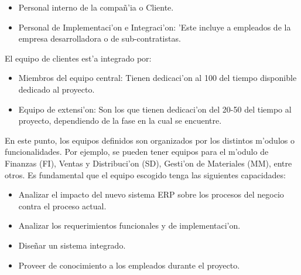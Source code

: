 \begin{itemize}
\item Personal interno de la compa\~n'ia o Cliente.
\item Personal de Implementaci'on e Integraci'on: 'Este incluye a empleados de la empresa desarrolladora o de sub-contratistas.
\end{itemize}
El equipo de clientes est'a integrado por:
\begin{itemize}
\item Miembros del equipo central: Tienen dedicaci'on al 100 del tiempo disponible dedicado al proyecto.
\item Equipo de extensi'on: Son los que tienen dedicaci'on del 20-50 del tiempo al proyecto, dependiendo de la fase en la cual se encuentre.
\end{itemize}
\indent En este punto, los equipos definidos son organizados por los distintos m'odulos o funcionalidades. Por ejemplo, se pueden tener equipos para el m'odulo de Finanzas (FI), Ventas y Distribuci'on (SD), Gesti'on de Materiales (MM), entre otros. 
\newline
\newline
\indent Es fundamental que el equipo escogido tenga las siguientes capacidades:
\begin{itemize}
\item Analizar el impacto del nuevo sistema ERP sobre los procesos del negocio contra el proceso actual.
\item Analizar los requerimientos funcionales y de implementaci'on. 
\item Dise\~nar un sistema integrado.
\item Proveer de conocimiento a los empleados durante el proyecto.
\end{itemize}
